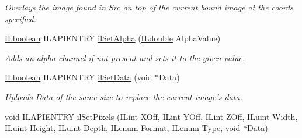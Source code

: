 \begin{DoxyCompactItemize}
\begin{DoxyCompactList}\small\item\em Overlays the image found in Src on top of the current bound image at the coords specified. \end{DoxyCompactList}\item 
\hyperlink{group__il__types_gaa6aa7c95cfdc06b4d8601ef832b7bb0a}{I\+Lboolean} I\+L\+A\+P\+I\+E\+N\+T\+R\+Y \hyperlink{group__image__manip_ga8887f494b3ed8dc889e783d5e3e3865f}{il\+Set\+Alpha} (\hyperlink{group__il__types_ga3896ba656038eb34345347cd095b020a}{I\+Ldouble} Alpha\+Value)
\begin{DoxyCompactList}\small\item\em Adds an alpha channel if not present and sets it to the given value. \end{DoxyCompactList}\item 
\hyperlink{group__il__types_gaa6aa7c95cfdc06b4d8601ef832b7bb0a}{I\+Lboolean} I\+L\+A\+P\+I\+E\+N\+T\+R\+Y \hyperlink{group__image__manip_ga0f4d316f0aa3420fae6817cd8b8c6a7c}{il\+Set\+Data} (void $\ast$Data)
\begin{DoxyCompactList}\small\item\em Uploads Data of the same size to replace the current image's data. \end{DoxyCompactList}\item 
\hypertarget{group__image__manip_gacbb2f4de541d3ea64b2ef079bb78e724}{void I\+L\+A\+P\+I\+E\+N\+T\+R\+Y \hyperlink{group__image__manip_gacbb2f4de541d3ea64b2ef079bb78e724}{il\+Set\+Pixels} (\hyperlink{group__il__types_ga8effe51a00daaa0878631e5af75a36cb}{I\+Lint} X\+Off, \hyperlink{group__il__types_ga8effe51a00daaa0878631e5af75a36cb}{I\+Lint} Y\+Off, \hyperlink{group__il__types_ga8effe51a00daaa0878631e5af75a36cb}{I\+Lint} Z\+Off, \hyperlink{group__il__types_gaff8e86a1072c8d7cfe387fb87c6ed8e1}{I\+Luint} Width, \hyperlink{group__il__types_gaff8e86a1072c8d7cfe387fb87c6ed8e1}{I\+Luint} Height, \hyperlink{group__il__types_gaff8e86a1072c8d7cfe387fb87c6ed8e1}{I\+Luint} Depth, \hyperlink{group__il__types_ga62ca73445716183ef42b1f3906a45ed0}{I\+Lenum} Format, \hyperlink{group__il__types_ga62ca73445716183ef42b1f3906a45ed0}{I\+Lenum} Type, void $\ast$Data)}\label{group__image__manip_gacbb2f4de541d3ea64b2ef079bb78e724}


\end{DoxyCompactItemize}
